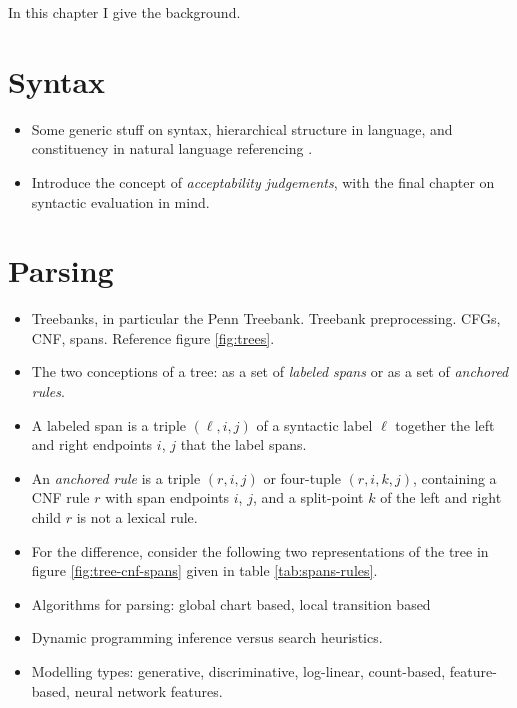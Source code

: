 % 

In this chapter I give the background.

\section{Syntax}
\begin{itemize}
  \item Some generic stuff on syntax, hierarchical structure in language, and constituency in natural language referencing \citet{Carnie2010:constituent,Everaert+2015:structures}.
  \item Introduce the concept of \textit{acceptability judgements}, with the final chapter on syntactic evaluation in mind.
\end{itemize}

\section{Parsing}
\begin{itemize}
  \item Treebanks, in particular the Penn Treebank. Treebank preprocessing. CFGs, CNF, spans. Reference figure \ref{fig:trees}.
  \item The two conceptions of a tree: as a set of \textit{labeled spans} or as a set of \textit{anchored rules}.
  \item A labeled span is a triple $(\ell, i, j)$ of a syntactic label $\ell$ together the left and right endpoints $i$, $j$ that the label spans.
  \item An \textit{anchored rule} is a triple $(r, i, j)$ or four-tuple $(r, i, k, j)$, containing a CNF rule $r$ with span endpoints $i$, $j$, and a split-point $k$ of the left and right child $r$ is not a lexical rule.
  \item For the difference, consider the following two representations of the tree in figure \ref{fig:tree-cnf-spans} given in table \ref{tab:spans-rules}.
  \item Algorithms for parsing: global chart based, local transition based
  \item Dynamic programming inference versus search heuristics.
  \item Modelling types: generative, discriminative, log-linear, count-based, feature-based, neural network features.
\end{itemize}

